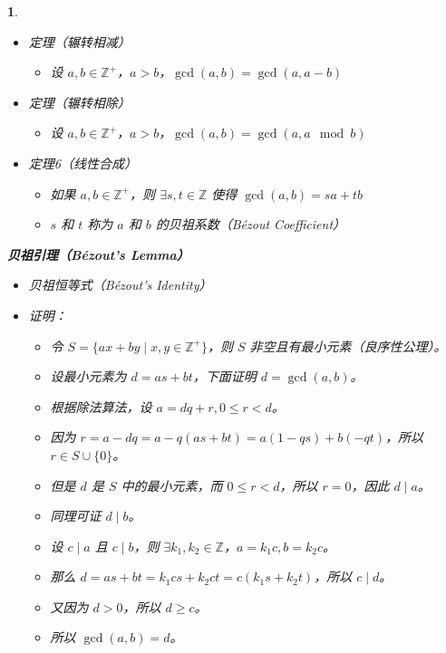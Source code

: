 \documentclass[UTF8]{report}
\theoremstyle{MyLineTheoremStyle} %
\theoremstyle{MyBlockTheoremStyle} %
\theoremstyle{MySubsubsectionStyle} %
\newtheorem{definition}{}
\begin{document}
\begin{definition}
    \begin{itemize}
        \item 定理（辗转相减）
        \begin{itemize}
            \item 设 $a, b \in \mathbb{Z}^+$，$a > b$，$\gcd(a, b) = \gcd(a, a - b)$
        \end{itemize}
        \item 定理（辗转相除）
        \begin{itemize}
            \item 设 $a, b \in \mathbb{Z}^+$，$a > b$，$\gcd(a, b) = \gcd(a, a \mod b)$
        \end{itemize}
        \item 定理6（线性合成）
        \begin{itemize}
            \item 如果 $a, b \in \mathbb{Z}^+$，则 $\exists s, t \in \mathbb{Z}$ 使得 $\gcd(a, b) = sa + tb$
            \item $s$ 和 $t$ 称为 $a$ 和 $b$ 的贝祖系数（Bézout Coefficient）
        \end{itemize}
    \end{itemize}

    \textbf{贝祖引理（Bézout’s Lemma）}
    \begin{itemize}
        \item 贝祖恒等式（Bézout’s Identity）
        \item 证明：
        \begin{itemize}
            \item 令 $S = \{ax + by \mid x, y \in \mathbb{Z}^+\}$，则 $S$ 非空且有最小元素（良序性公理）。
            \item 设最小元素为 $d = as + bt$，下面证明 $d = \gcd(a, b)$。
            \item 根据除法算法，设 $a = dq + r, 0 \leq r < d$。
            \item 因为 $r = a - dq = a - q(as + bt) = a(1 - qs) + b(-qt)$，所以 $r \in S \cup \{0\}$。
            \item 但是 $d$ 是 $S$ 中的最小元素，而 $0 \leq r < d$，所以 $r = 0$，因此 $d \mid a$。
            \item 同理可证 $d \mid b$。
            \item 设 $c \mid a$ 且 $c \mid b$，则 $\exists k_1, k_2 \in \mathbb{Z}$，$a = k_1c, b = k_2c$。
            \item 那么 $d = as + bt = k_1cs + k_2ct = c(k_1s + k_2t)$，所以 $c \mid d$。
            \item 又因为 $d > 0$，所以 $d \geq c$。
            \item 所以 $\gcd(a, b) = d$。
        \end{itemize}
    \end{itemize}


\end{definition}
\end{document}
